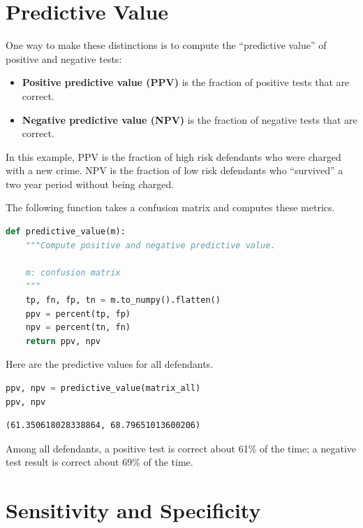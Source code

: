 \section{Predictive Value}\label{predictive-value}

One way to make these distinctions is to compute the ``predictive
value'' of positive and negative tests:

\begin{itemize}
\item
  \textbf{Positive predictive value (PPV)} is the fraction of positive
  tests that are correct.
\item
  \textbf{Negative predictive value (NPV)} is the fraction of negative
  tests that are correct.
\end{itemize}

In this example, PPV is the fraction of high risk defendants who were
charged with a new crime. NPV is the fraction of low risk defendants who
``survived'' a two year period without being charged.

The following function takes a confusion matrix and computes these
metrics.

\begin{lstlisting}[language=Python,style=source]
def predictive_value(m):
    """Compute positive and negative predictive value.

    m: confusion matrix
    """
    tp, fn, fp, tn = m.to_numpy().flatten()
    ppv = percent(tp, fp)
    npv = percent(tn, fn)
    return ppv, npv
\end{lstlisting}

Here are the predictive values for all defendants.

\begin{lstlisting}[language=Python,style=source]
ppv, npv = predictive_value(matrix_all)
ppv, npv
\end{lstlisting}

\begin{lstlisting}[style=output]
(61.350618028338864, 68.79651013600206)
\end{lstlisting}

Among all defendants, a positive test is correct about 61\% of the time;
a negative test result is correct about 69\% of the time.

\section{Sensitivity and Specificity}\label{sensitivity-and-specificity}

